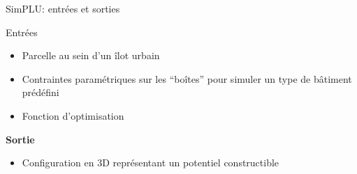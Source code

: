 \documentclass[xcolor=table]{beamer}
\begin{document}
\begin{frame}{SimPLU: entrées et sorties}
	\begin{block}{Entrées}

		\begin{itemize}
			\small
			\item Parcelle au sein d'un îlot urbain
			\item Contraintes paramétriques sur les ``boîtes'' pour simuler un type de bâtiment prédéfini
			\item Fonction d'optimisation
		\end{itemize}
		\textbf{Sortie}
		\begin{itemize}
			\small
			\item Configuration en 3D représentant un potentiel constructible
		\end{itemize}
	\end{block}
	\begin{block}
	\end{block}		
\end{frame}
\end{document}
